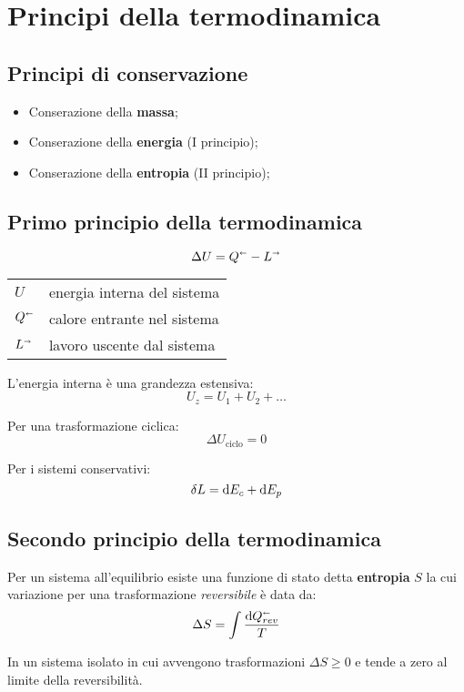 \section{Principi della termodinamica}

\subsection{Principi di conservazione}
\begin{itemize}
    \item Conserazione della \textbf{massa};
    \item Conserazione della \textbf{energia} (I principio);
    \item Conserazione della \textbf{entropia} (II principio);
\end{itemize}

\subsection{Primo principio della termodinamica}

\[\Delta U = Q^\shortleftarrow - L^\shortrightarrow \]

\begin{tabular}{ll}
    $U$ & energia interna del sistema \\
    $Q^\shortleftarrow$ & calore entrante nel sistema \\
    $L^\shortrightarrow$ & lavoro uscente dal sistema \\
\end{tabular}

L'energia interna è una grandezza estensiva:
\[U_z = U_1 + U_2 + \ldots\]

Per una trasformazione ciclica:
\[\Delta U_{\text{ciclo}} = 0 \]

Per i sistemi conservativi:
\[\var{L} = \dd{E_c} + \dd{E_p}\]


\subsection{Secondo principio della termodinamica}

Per un sistema all'equilibrio esiste una funzione di stato detta \textbf{entropia} $S$ la cui variazione per una trasformazione \emph{reversibile} è data da:
\[\Delta S = \int \frac{\dd{Q_{rev}^\shortleftarrow}}{T}\]

In un sistema isolato in cui avvengono trasformazioni $\Delta S \ge 0$ e tende a zero al limite della reversibilità.

